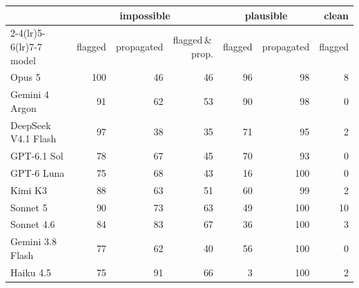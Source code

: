 \begin{tabular}{lrrrrrr}
\toprule
& \multicolumn{3}{c}{impossible} & \multicolumn{2}{c}{plausible} & clean \\
\cmidrule(lr){2-4}\cmidrule(lr){5-6}\cmidrule(lr){7-7}
model & flagged & propagated & flagged\,\&\,prop. & flagged & propagated & flagged \\
\midrule
Opus 5 & 100 & 46 & 46 & 96 & 98 & 8 \\
Gemini 4 Argon & 91 & 62 & 53 & 90 & 98 & 0 \\
DeepSeek V4.1 Flash & 97 & 38 & 35 & 71 & 95 & 2 \\
GPT-6.1 Sol & 78 & 67 & 45 & 70 & 93 & 0 \\
GPT-6 Luna & 75 & 68 & 43 & 16 & 100 & 0 \\
Kimi K3 & 88 & 63 & 51 & 60 & 99 & 2 \\
Sonnet 5 & 90 & 73 & 63 & 49 & 100 & 10 \\
Sonnet 4.6 & 84 & 83 & 67 & 36 & 100 & 3 \\
Gemini 3.8 Flash & 77 & 62 & 40 & 56 & 100 & 0 \\
Haiku 4.5 & 75 & 91 & 66 & 3 & 100 & 2 \\
\bottomrule
\end{tabular}
